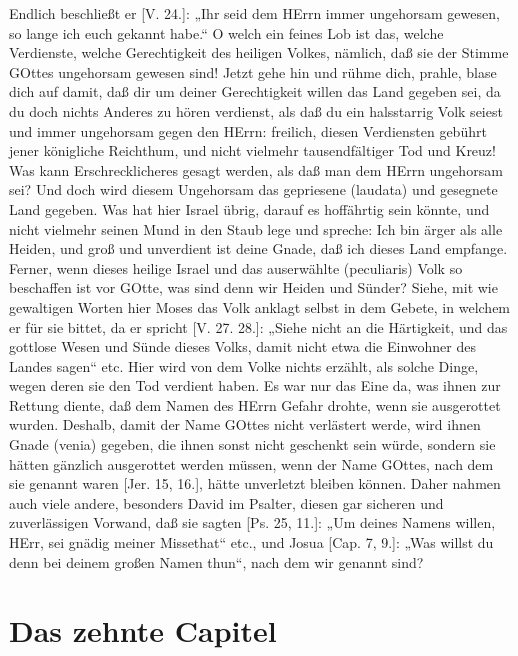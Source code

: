 Endlich beschließt er [V. 24.]: „Ihr seid dem HErrn immer ungehorsam gewesen, so lange ich euch gekannt habe.“ O welch ein feines Lob ist das, welche Verdienste, welche Gerechtigkeit des heiligen Volkes, nämlich, daß sie der Stimme GOttes ungehorsam gewesen sind! Jetzt gehe hin und rühme dich, prahle, blase dich auf damit, daß dir um deiner Gerechtigkeit willen das Land gegeben sei, da du doch nichts Anderes zu hören verdienst, als daß du ein halsstarrig Volk seiest und immer ungehorsam gegen den HErrn: freilich, diesen Verdiensten gebührt jener königliche Reichthum, und nicht vielmehr tausendfältiger Tod und Kreuz! Was kann Erschrecklicheres gesagt werden, als daß man dem HErrn ungehorsam sei? Und doch wird diesem Ungehorsam das gepriesene (laudata) und gesegnete Land gegeben. Was hat hier Israel übrig, darauf es hoffährtig sein könnte, und nicht vielmehr seinen Mund in den Staub lege und spreche: Ich bin ärger als alle Heiden, und groß und unverdient ist deine Gnade, daß ich dieses Land empfange. Ferner, wenn dieses heilige Israel und das auserwählte (peculiaris) Volk so beschaffen ist vor GOtte, was sind denn wir Heiden und Sünder? Siehe, mit wie gewaltigen Worten hier Moses das Volk anklagt selbst in dem Gebete, in welchem er für sie bittet, da er spricht [V. 27. 28.]: „Siehe nicht an die Härtigkeit, und das gottlose Wesen und Sünde dieses Volks, damit nicht etwa die Einwohner des Landes sagen“ etc. Hier wird von dem Volke nichts erzählt, als solche Dinge, wegen deren sie den Tod verdient haben. Es war nur das Eine da, was ihnen zur Rettung diente, daß dem Namen des HErrn Gefahr drohte, wenn sie ausgerottet wurden. Deshalb, damit der Name GOttes nicht verlästert werde, wird ihnen Gnade (venia) gegeben, die ihnen sonst nicht geschenkt sein würde, sondern sie hätten gänzlich ausgerottet werden müssen, wenn der Name GOttes, nach dem sie genannt waren [Jer. 15, 16.], hätte unverletzt bleiben können. Daher nahmen auch viele andere, besonders David im Psalter, diesen gar sicheren und zuverlässigen Vorwand, daß sie sagten [Ps. 25, 11.]: „Um deines Namens willen, HErr, sei gnädig meiner Missethat“ etc., und Josua [Cap. 7, 9.]: „Was willst du denn bei deinem großen Namen thun“, nach dem wir genannt sind?

\section{Das zehnte Capitel}

